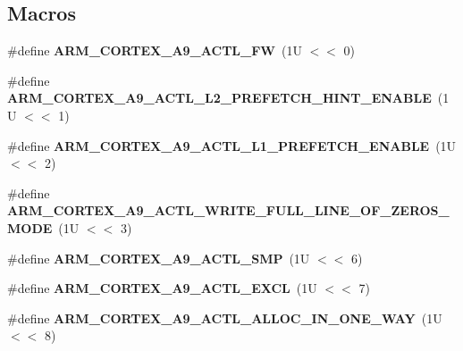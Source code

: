 \subsection*{Macros}
\begin{DoxyCompactItemize}
\item 
\mbox{\label{group__RTEMSScoreCPUARMCP15_gae0c7d5196f329db9a9921303a06b92ee}} 
\#define {\bfseries A\+R\+M\+\_\+\+C\+O\+R\+T\+E\+X\+\_\+\+A9\+\_\+\+A\+C\+T\+L\+\_\+\+FW}~(1\+U $<$$<$ 0)
\item 
\mbox{\label{group__RTEMSScoreCPUARMCP15_gabcd80fd845848c069c0d1746b93e5167}} 
\#define {\bfseries A\+R\+M\+\_\+\+C\+O\+R\+T\+E\+X\+\_\+\+A9\+\_\+\+A\+C\+T\+L\+\_\+\+L2\+\_\+\+P\+R\+E\+F\+E\+T\+C\+H\+\_\+\+H\+I\+N\+T\+\_\+\+E\+N\+A\+B\+LE}~(1\+U $<$$<$ 1)
\item 
\mbox{\label{group__RTEMSScoreCPUARMCP15_ga216da6887a331253e2d48cbd1fdce8a9}} 
\#define {\bfseries A\+R\+M\+\_\+\+C\+O\+R\+T\+E\+X\+\_\+\+A9\+\_\+\+A\+C\+T\+L\+\_\+\+L1\+\_\+\+P\+R\+E\+F\+E\+T\+C\+H\+\_\+\+E\+N\+A\+B\+LE}~(1\+U $<$$<$ 2)
\item 
\mbox{\label{group__RTEMSScoreCPUARMCP15_ga4ea007690565186e7155b9e79d2c96b1}} 
\#define {\bfseries A\+R\+M\+\_\+\+C\+O\+R\+T\+E\+X\+\_\+\+A9\+\_\+\+A\+C\+T\+L\+\_\+\+W\+R\+I\+T\+E\+\_\+\+F\+U\+L\+L\+\_\+\+L\+I\+N\+E\+\_\+\+O\+F\+\_\+\+Z\+E\+R\+O\+S\+\_\+\+M\+O\+DE}~(1\+U $<$$<$ 3)
\item 
\mbox{\label{group__RTEMSScoreCPUARMCP15_gaeb83549a6ff41e7d1badb5b3ee26f3e3}} 
\#define {\bfseries A\+R\+M\+\_\+\+C\+O\+R\+T\+E\+X\+\_\+\+A9\+\_\+\+A\+C\+T\+L\+\_\+\+S\+MP}~(1\+U $<$$<$ 6)
\item 
\mbox{\label{group__RTEMSScoreCPUARMCP15_ga35e6349ef29bf03d684eb93f1a78d324}} 
\#define {\bfseries A\+R\+M\+\_\+\+C\+O\+R\+T\+E\+X\+\_\+\+A9\+\_\+\+A\+C\+T\+L\+\_\+\+E\+X\+CL}~(1\+U $<$$<$ 7)
\item 
\mbox{\label{group__RTEMSScoreCPUARMCP15_ga30df76796e087581ddac7e8c538f030e}} 
\#define {\bfseries A\+R\+M\+\_\+\+C\+O\+R\+T\+E\+X\+\_\+\+A9\+\_\+\+A\+C\+T\+L\+\_\+\+A\+L\+L\+O\+C\+\_\+\+I\+N\+\_\+\+O\+N\+E\+\_\+\+W\+AY}~(1\+U $<$$<$ 8)
$$
\end{DoxyCompactItemize}
